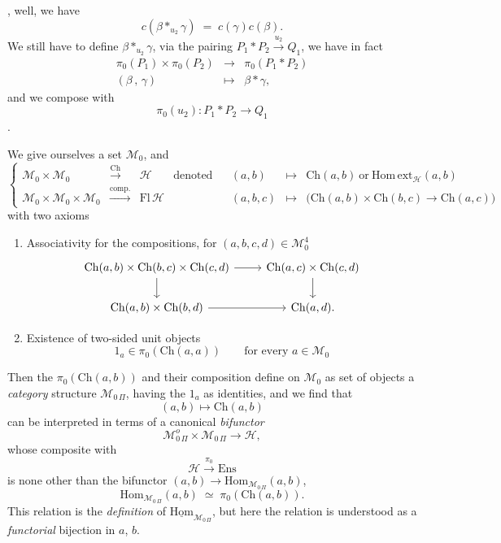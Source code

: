 \documentclass[11pt]{article}
\newcommand{\printedpage}[1]{\marginpar{\footnotesize p.~#1}}
\newcommand{\msp}[1]{\marginpar{\footnotesize [#1]}}
\newcommand{\MOP}{\mathcal{M}_{0\,\Pi}}
\begin{document}
\printedpage{5}
, well, we have
\[
\boxed{\;c(\beta *_{u_2}\gamma) \;=\; c(\gamma)c(\beta).\;}
\]
We still have to define $\beta *_{u_2}\gamma$, via the pairing $P_1*P_2\xrightarrow{u_2}Q_1$, we have in fact
\[
\begin{array}{ccc}
\pi_0(P_1)\times\pi_0(P_2) & \longrightarrow & \pi_0(P_1*P_2)\\
(\beta\,,\,\gamma) & \longmapsto & \beta*\gamma,
\end{array}
\]
and we compose with
\[
\pi_0(u_2) : P_1*P_2 \longrightarrow Q_1
\]
.

\msp{page 7}
We give ourselves a set $\mathcal{M}_0$, and
\[
\left\{
\begin{array}{rclccrcl}
\mathcal{M}_0\times\mathcal{M}_0 & \xrightarrow{\mathrm{Ch}} & \mathcal{H} & \text{denoted} & & (a,b) & \longmapsto & \mathrm{Ch}(a,b)\ \text{or}\ \mathrm{Hom\,ext}_{\mathcal{H}}(a,b)\\
\mathcal{M}_0\times\mathcal{M}_0\times\mathcal{M}_0 & \xrightarrow{\text{comp.}} & \mathrm{Fl}\,\mathcal{H} & & & (a,b,c) & \longmapsto & \bigl(\mathrm{Ch}(a,b)\times\mathrm{Ch}(b,c)\longrightarrow\mathrm{Ch}(a,c)\bigr)
\end{array}
\right.
\]
with two axioms

\begin{enumerate}
\item[a)] Associativity for the compositions, for $(a,b,c,d)\in\mathcal{M}_0^4$
\[
\begin{tikzcd}
\mathrm{Ch}(a,b)\times\mathrm{Ch}(b,c)\times\mathrm{Ch}(c,d) \arrow[r] \arrow[d] & \mathrm{Ch}(a,c)\times\mathrm{Ch}(c,d) \arrow[d]\\
\mathrm{Ch}(a,b)\times\mathrm{Ch}(b,d) \arrow[r] & \mathrm{Ch}(a,d).
\end{tikzcd}
\]
\item[b)] Existence of two-sided unit objects
\[
1_a\in\pi_0(\mathrm{Ch}(a,a)) \qquad \text{for every } a\in\mathcal{M}_0
\]
\end{enumerate}

Then the $\pi_0(\mathrm{Ch}(a,b))$ and their composition define on $\mathcal{M}_0$ as set of objects a \textit{category} structure $\MOP$, having the $1_a$ as identities, and we find that
\[
(a,b)\longmapsto\mathrm{Ch}(a,b)
\]
can be interpreted in terms of a canonical \textit{bifunctor}
\[
\mathcal{M}^o_{0\,\Pi}\times\MOP \longrightarrow \mathcal{H},
\]
whose composite with
\[
\mathcal{H}\xrightarrow{\pi_0}\mathrm{Ens}
\]
is none other than the bifunctor $(a,b)\longrightarrow\mathrm{Hom}_{\MOP}(a,b)$,
\printedpage{6}
\msp{page 8}
\[
\mathrm{Hom}_{\MOP}(a,b) \;\simeq\; \pi_0(\mathrm{Ch}(a,b)).
\]
This relation is the \textit{definition} of $\underline{\mathrm{Hom}}_{\MOP}$, but here the relation is understood as a %
\textit{functorial} bijection in $a$, $b$.
\end{document}
